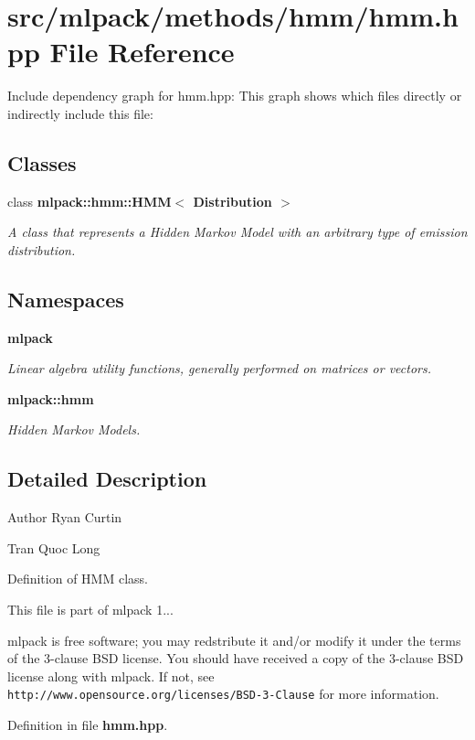 \section{src/mlpack/methods/hmm/hmm.hpp File Reference}
\label{hmm_8hpp}
Include dependency graph for hmm.\-hpp\-:
This graph shows which files directly or indirectly include this file\-:
\subsection*{Classes}
\begin{DoxyCompactItemize}
\item 
class {\bf mlpack\-::hmm\-::\-H\-M\-M$<$ Distribution $>$}
\begin{DoxyCompactList}\small\item\em A class that represents a Hidden Markov Model with an arbitrary type of emission distribution. \end{DoxyCompactList}\end{DoxyCompactItemize}
\subsection*{Namespaces}
\begin{DoxyCompactItemize}
\item 
{\bf mlpack}
\begin{DoxyCompactList}\small\item\em Linear algebra utility functions, generally performed on matrices or vectors. \end{DoxyCompactList}\item 
{\bf mlpack\-::hmm}
\begin{DoxyCompactList}\small\item\em Hidden Markov Models. \end{DoxyCompactList}\end{DoxyCompactItemize}


\subsection{Detailed Description}
\begin{DoxyAuthor}{Author}
Ryan Curtin 

Tran Quoc Long
\end{DoxyAuthor}
Definition of H\-M\-M class.

This file is part of mlpack 1...

mlpack is free software; you may redstribute it and/or modify it under the terms of the 3-\/clause B\-S\-D license. You should have received a copy of the 3-\/clause B\-S\-D license along with mlpack. If not, see {\tt http\-://www.\-opensource.\-org/licenses/\-B\-S\-D-\/3-\/\-Clause} for more information. 

Definition in file {\bf hmm.\-hpp}.

